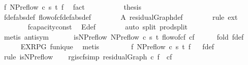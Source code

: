 \begin{isabellebody}
\ f{\isacharprime}{\isacharcolon}\ NPreflow\ c\ s\ t\ f{\isacharprime}\ \isamarkupfalse%
\ fact\isanewline
\ \ \ \ \isanewline
\ \ \ \ \isamarkupfalse%
\ {\isacharquery}thesis\isanewline
\ \ \ \ \ \ \isamarkupfalse%
\ f{\isacharunderscore}def{\isacharbrackleft}abs{\isacharunderscore}def{\isacharbrackright}\ flow{\isacharunderscore}of{\isacharunderscore}cf{\isacharunderscore}def{\isacharbrackleft}abs{\isacharunderscore}def{\isacharbrackright}\isanewline
\ \ \ \ \ \ \isamarkupfalse%
\ A\ residualGraph{\isacharunderscore}def\isanewline
\ \ \ \ \ \ \isamarkupfalse%
\ {\isacharparenleft}rule\ ext{\isacharparenright}\isanewline
\ \ \ \ \ \ \isamarkupfalse%
\ f{\isacharprime}{\isachardot}capacity{\isacharunderscore}const\ \isamarkupfalse%
\ E{\isacharunderscore}def\isanewline
\ \ \ \ \ \ \isamarkupfalse%
\ {\isacharparenleft}auto\ split{\isacharcolon}\ prod{\isachardot}split{\isacharparenright}\isanewline
\ \ \ \ \ \ \isamarkupfalse%
\ {\isacharparenleft}metis\ antisym{\isacharparenright}\isanewline
\ \ \isamarkupfalse%
%
\endisatagproof
{\isafoldproof}%
%
\isadelimproof
\isanewline
%
\endisadelimproof
\isanewline
\ \ \isamarkupfalse%
\ is{\isacharunderscore}NPreflow{\isacharcolon}\ {\isachardoublequoteopen}NPreflow\ c\ s\ t\ {\isacharparenleft}flow{\isacharunderscore}of{\isacharunderscore}cf\ cf{\isacharparenright}{\isachardoublequoteclose}\isanewline
%
\isadelimproof
\ \ \ \ %
\endisadelimproof
%
\isatagproof
{}\isamarkupfalse%
\ {\isacharparenleft}fold\ f{\isacharunderscore}def{\isacharparenright}\isanewline
\ \ \ \ \isamarkupfalse%
\ EX{\isacharunderscore}RPG\ f{\isacharunderscore}unique\ \isamarkupfalse%
\ metis%
\endisatagproof
{\isafoldproof}%
%
\isadelimproof
\isanewline
%
\endisadelimproof
\ \ \ \ \isanewline
\ \ \isamarkupfalse%
\ f{\isacharcolon}\ NPreflow\ c\ s\ t\ f%
\isadelimproof
\ %
\endisadelimproof
%
\isatagproof
{}\isamarkupfalse%
\ f{\isacharunderscore}def\ \isamarkupfalse%
\ {\isacharparenleft}rule\ is{\isacharunderscore}NPreflow{\isacharparenright}%
\endisatagproof
{\isafoldproof}%
%
\isadelimproof
%
\endisadelimproof
\isanewline
\isanewline
\ \ \isamarkupfalse%
\ rg{\isacharunderscore}is{\isacharunderscore}cf{\isacharbrackleft}simp{\isacharbrackright}{\isacharcolon}\ {\isachardoublequoteopen}residualGraph\ c\ f\ {\isacharequal}\ cf{\isachardoublequoteclose}\isanewline

\end{isabellebody}
